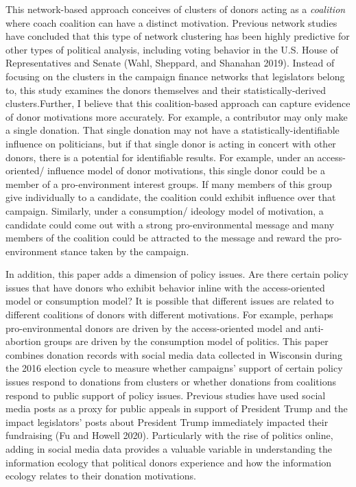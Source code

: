 \documentclass[12pt,]{article}
\begin{document}
This network-based approach conceives of clusters of donors acting as a
\emph{coalition} where coach coalition can have a distinct motivation.
Previous network studies have concluded that this type of network
clustering has been highly predictive for other types of political
analysis, including voting behavior in the U.S. House of Representatives
and Senate (Wahl, Sheppard, and Shanahan 2019). Instead of focusing on
the clusters in the campaign finance networks that legislators belong
to, this study examines the donors themselves and their
statistically-derived clusters.Further, I believe that this
coalition-based approach can capture evidence of donor motivations more
accurately. For example, a contributor may only make a single donation.
That single donation may not have a statistically-identifiable influence
on politicians, but if that single donor is acting in concert with other
donors, there is a potential for identifiable results. For example,
under an access-oriented/ influence model of donor motivations, this
single donor could be a member of a pro-environment interest groups. If
many members of this group give individually to a candidate, the
coalition could exhibit influence over that campaign. Similarly, under a
consumption/ ideology model of motivation, a candidate could come out
with a strong pro-environmental message and many members of the
coalition could be attracted to the message and reward the
pro-environment stance taken by the campaign.

In addition, this paper adds a dimension of policy issues. Are there
certain policy issues that have donors who exhibit behavior inline with
the access-oriented model or consumption model? It is possible that
different issues are related to different coalitions of donors with
different motivations. For example, perhaps pro-environmental donors are
driven by the access-oriented model and anti-abortion groups are driven
by the consumption model of politics. This paper combines donation
records with social media data collected in Wisconsin during the 2016
election cycle to measure whether campaigns' support of certain policy
issues respond to donations from clusters or whether donations from
coalitions respond to public support of policy issues. Previous studies
have used social media posts as a proxy for public appeals in support of
President Trump and the impact legislators' posts about President Trump
immediately impacted their fundraising (Fu and Howell 2020).
Particularly with the rise of politics online, adding in social media
data provides a valuable variable in understanding the information
ecology that political donors experience and how the information ecology
relates to their donation motivations.
\end{document}
